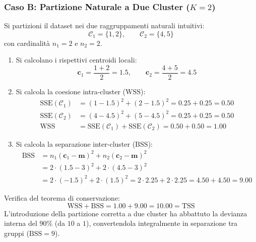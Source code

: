 \subsubsection{Caso B: Partizione Naturale a Due Cluster ($K=2$)}
Si partizioni il dataset nei due raggruppamenti naturali intuitivi:
\begin{equation}
\mathcal{C}_1 = \{1, 2\}, \qquad \mathcal{C}_2 = \{4, 5\}
\end{equation}
con cardinalità $n_1 = 2$ e $n_2 = 2$.
\begin{enumerate}
    \item Si calcolano i rispettivi centroidi locali:
    \begin{equation}
    \mathbf{c}_1 = \frac{1 + 2}{2} = 1.5, \qquad \mathbf{c}_2 = \frac{4 + 5}{2} = 4.5
    \end{equation}
    
    \item Si calcola la coesione intra-cluster ($\mathrm{WSS}$):
    \begin{align}
    \mathrm{SSE}(\mathcal{C}_1) &= (1 - 1.5)^2 + (2 - 1.5)^2 = 0.25 + 0.25 = 0.50 \\
    \mathrm{SSE}(\mathcal{C}_2) &= (4 - 4.5)^2 + (5 - 4.5)^2 = 0.25 + 0.25 = 0.50 \\
    \mathrm{WSS} &= \mathrm{SSE}(\mathcal{C}_1) + \mathrm{SSE}(\mathcal{C}_2) = 0.50 + 0.50 = 1.00
    \end{align}
    
    \item Si calcola la separazione inter-cluster ($\mathrm{BSS}$):
    \begin{align}
    \mathrm{BSS} &= n_1 (\mathbf{c}_1 - \mathbf{m})^2 + n_2 (\mathbf{c}_2 - \mathbf{m})^2 \\
    &= 2 \cdot (1.5 - 3)^2 + 2 \cdot (4.5 - 3)^2 \\
    &= 2 \cdot (-1.5)^2 + 2 \cdot (1.5)^2 = 2 \cdot 2.25 + 2 \cdot 2.25 = 4.50 + 4.50 = 9.00
    \end{align}
\end{enumerate}
Verifica del teorema di conservazione:
\begin{equation}
\mathrm{WSS} + \mathrm{BSS} = 1.00 + 9.00 = 10.00 = \mathrm{TSS}
\end{equation}
L'introduzione della partizione corretta a due cluster ha abbattuto la devianza interna del $90\%$ (da $10$ a $1$), convertendola integralmente in separazione tra gruppi ($\mathrm{BSS} = 9$).

\FloatBarrier
